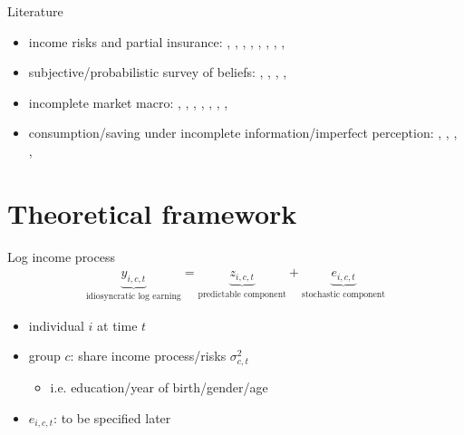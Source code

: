 \documentclass{beamer}
\begin{document}
\begin{frame}{Literature}
	\begin{itemize}
		\item income risks and partial insurance: {\scriptsize\cite{gottschalk1994growth}, \cite{carroll1997nature}, \cite{meghir2004income}, \cite{storesletten2004cyclical}, \cite{blundell_consumption_2008}, \cite{moffitt2002trends},  \cite{guvenen2014nature},  \cite{arellano2017earnings}, \cite{bloom2018great}}
		\item subjective/probabilistic survey of beliefs: {\scriptsize\cite{manski_measuring_2004}, \cite{delavande2011measuring}, \cite{manski_survey_2018},  \cite{bertrand_people_2001}, \cite{armantier_overview_2017}} 
		\item incomplete market macro: {\scriptsize\cite{bewley1976permanent}, 
		 \cite{aiyagari1994uninsured},
		\cite{huggett1996wealth}, \cite{krusell1998income}, \cite{heathcote2009quantitative},  \cite{carroll2017distribution}, \cite{krueger2016macroeconomics},  \cite{bayer2019precautionary}}
		\item consumption/saving under incomplete information/imperfect perception:  {\scriptsize\cite{pischke1995individual}, \cite{wang2004precautionary}, \cite{rozsypal_overpersistence_2017}, \cite{carroll_sticky_2018}, \cite{lian2019imperfect}}
	
	\end{itemize}
\end{frame}


\section{Theoretical framework}

\begin{frame}{Log income process}
	\begin{equation*}
		\begin{split}
			\underbrace{y_{i,c,t}}_{\text{idiosyncratic log earning}} = \underbrace{z_{i,c,t}}_{\text{predictable component}}  + \underbrace{e_{i,c,t}}_{\text{stochastic component}}
		\end{split} 
	\end{equation*}
	
	\begin{itemize}
		\item individual \(i\) at time \(t\) 
		\item group $c$: share income process/risks $\sigma^2_{c,t}$
		\begin{itemize}
			\item i.e. education/year of birth/gender/age
		\end{itemize}
		\item $e_{i,c,t}$: to be specified later
	\end{itemize}
\end{frame}
\end{document}
